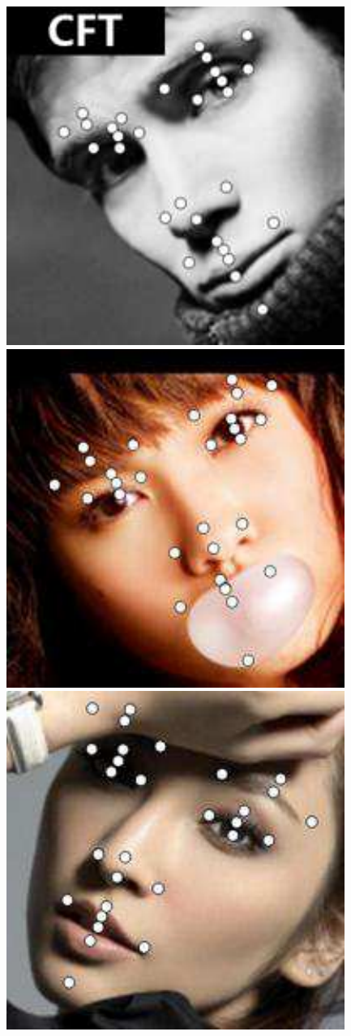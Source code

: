 \documentclass[journal]{IEEEtran}
\begin{document}
\begin{figure}[!htb]
{\begin{minipage}[b]{0.38\textwidth}
\includegraphics[scale=0.22]{29_CFT_133}
\includegraphics[scale=0.22]{29_CFT_264}
\includegraphics[scale=0.22]{29_CFT_150}

\end{minipage}}
\end{figure}
\end{document}
